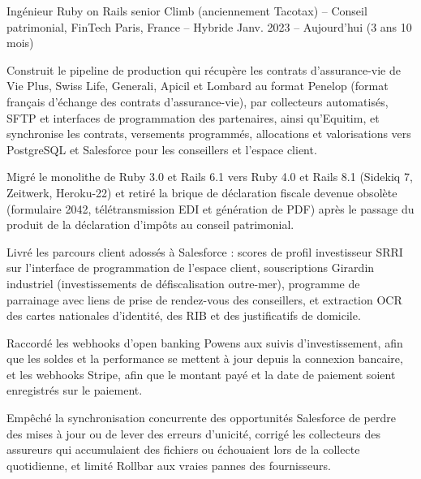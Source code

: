 \begin{cventries}
\cventry
  {Ingénieur Ruby on Rails senior}
  {Climb (anciennement Tacotax) – Conseil patrimonial, FinTech}
  {Paris, France – Hybride}
  {Janv. 2023 – Aujourd'hui (3 ans 10 mois)}
  {
    \begin{cvitems}
      \item {Construit le pipeline de production qui récupère les contrats d'assurance-vie de Vie Plus, Swiss Life, Generali, Apicil et Lombard au format Penelop (format français d'échange des contrats d'assurance-vie), par collecteurs automatisés, SFTP et interfaces de programmation des partenaires, ainsi qu'Equitim, et synchronise les contrats, versements programmés, allocations et valorisations vers PostgreSQL et Salesforce pour les conseillers et l'espace client.}
      \item {Migré le monolithe de Ruby 3.0 et Rails 6.1 vers Ruby 4.0 et Rails 8.1 (Sidekiq 7, Zeitwerk, Heroku-22) et retiré la brique de déclaration fiscale devenue obsolète (formulaire 2042, télétransmission EDI et génération de PDF) après le passage du produit de la déclaration d'impôts au conseil patrimonial.}
      \item {Livré les parcours client adossés à Salesforce : scores de profil investisseur SRRI sur l'interface de programmation de l'espace client, souscriptions Girardin industriel (investissements de défiscalisation outre-mer), programme de parrainage avec liens de prise de rendez-vous des conseillers, et extraction OCR des cartes nationales d'identité, des RIB et des justificatifs de domicile.}
      \item {Raccordé les webhooks d'open banking Powens aux suivis d'investissement, afin que les soldes et la performance se mettent à jour depuis la connexion bancaire, et les webhooks Stripe, afin que le montant payé et la date de paiement soient enregistrés sur le paiement.}
      \item {Empêché la synchronisation concurrente des opportunités Salesforce de perdre des mises à jour ou de lever des erreurs d'unicité, corrigé les collecteurs des assureurs qui accumulaient des fichiers ou échouaient lors de la collecte quotidienne, et limité Rollbar aux vraies pannes des fournisseurs.}
    \end{cvitems}
  }


\end{cventries}
